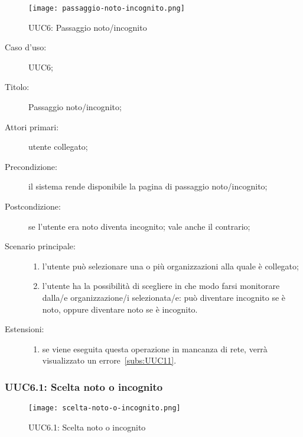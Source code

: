 \documentclass[../../../analisi-dei-requisiti.tex]{subfiles}
\begin{document}
\begin{figure}[H]
  \centering
  \texttt{[image: passaggio-noto-incognito.png]}
  \caption{UUC6: Passaggio noto/incognito}%
  \label{fig:UUC6}
\end{figure}

\begin{description}
  \item[Caso d’uso:] UUC6;
  \item[Titolo:] Passaggio noto/incognito;
  \item[Attori primari:] utente collegato;
  \item[Precondizione:] il sistema rende disponibile la pagina di passaggio noto/incognito;
  \item[Postcondizione:] se l'utente era noto diventa incognito; vale anche il contrario;
  \item[Scenario principale:]
        \begin{enumerate}
          \item l'utente può selezionare una o più organizzazioni alla quale è collegato;
          \item l'utente ha la possibilità di scegliere in che modo farsi monitorare dalla/e organizzazione/i selezionata/e:
                può diventare incognito se è noto, oppure diventare noto se è incognito.
        \end{enumerate}
  \item[Estensioni:]
        \begin{enumerate}
          \item se viene eseguita questa operazione in mancanza di rete, verrà visualizzato un errore~\ref{subs:UUC11}.
        \end{enumerate}
\end{description}

\subsubsection{UUC6.1: Scelta noto o incognito}%
\label{subs:UUC6.1}

\begin{figure}[H]
  \centering
  \texttt{[image: scelta-noto-o-incognito.png]}
  \caption{UUC6.1: Scelta noto o incognito}%
  \label{fig:UUC6_1}
\end{figure}
\end{document}
